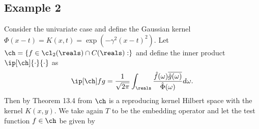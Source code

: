 \documentclass[11pt]{amsart}
\newcommand{\g}{\gamma}
\theoremstyle{definition}
\begin{document}
\subsection{Example 2}
Consider the univariate case and define the Gaussian kernel $\Phi(x-t)=K(x,t)=\exp(-\g^2(x-t)^2)$. Let $\ch=\left\{f\in\cl_2(\reals)\cap C(\reals):\right\}$ and define the inner product $\ip[\ch]{\cdot}{\cdot}$ as
$$\ip[\ch]fg=\frac1{\sqrt{2\pi}}\int_\reals\frac{\hat f(\omega)\overline{\hat g(\omega)}}{\hat\Phi(\omega)}d\omega.$$
Then by Theorem 13.4 from \cite{Fas07a} $\ch$ is a reproducing kernel Hilbert space with the kernel $K(x,y)$. We take again $T$ to be the embedding operator and let the test function $f\in\ch$ be given by





\end{document}
